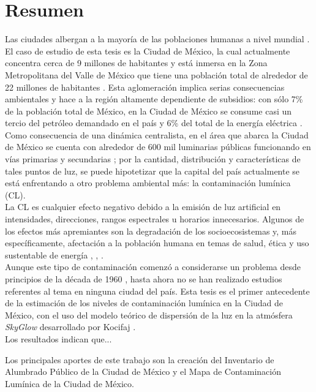 \chapter{Resumen}

Las ciudades albergan a la mayoría de las poblaciones humanas a nivel mundial \citep{Zari2018}. El caso de estudio de esta tesis es la Ciudad de México, la cual actualmente concentra cerca de 9 millones de habitantes \citep{INEGI2015} y está inmersa en la Zona Metropolitana del Valle de México que tiene una población total de alrededor de 22 millones de habitantes \citep{OCDE2015}. Esta aglomeración implica serias consecuencias ambientales y hace a la región altamente dependiente de subsidios: con sólo 7\% de la población total de México, en la Ciudad de México se consume casi un tercio del petróleo demandado en el país y 6\% del total de la energía eléctrica \citep{SENER2013}.\\

Como consecuencia de una dinámica centralista, en el área que abarca la Ciudad de México se cuenta con alrededor de 600 mil luminarias públicas funcionando en vías primarias y secundarias \citep{INFO2019}; por la cantidad, distribución y características de tales puntos de luz, se puede hipotetizar que la capital del país actualmente se está enfrentando a otro problema ambiental más: la contaminación lumínica (CL).\\

La CL es cualquier efecto negativo debido a la emisión de luz artificial en intensidades, direcciones, rangos espectrales u horarios innecesarios. Algunos de los efectos más apremiantes son la degradación de los socioecosistemas y, más específicamente, afectación a la población humana en temas de salud, ética y uso sustentable de energía \citep{AtlasREPSA}, \citep{LibroCL}, \citep{Stone2017}.\\

Aunque este tipo de contaminación comenzó a considerarse un problema desde principios de la década de 1960 \citep{LibroCL}, hasta ahora no se han realizado estudios referentes al tema en ninguna ciudad del país. Esta tesis es el primer antecedente de la estimación de los niveles de contaminación lumínica en la Ciudad de México, con el uso del modelo teórico de dispersión de la luz en la atmósfera \textit{SkyGlow} desarrollado por Kocifaj \citep{Kocifaj2007}.\\


Los resultados indican que...

Los principales aportes de este trabajo son la creación del Inventario de Alumbrado Público de la Ciudad de México y el Mapa de Contaminación Lumínica de la Ciudad de México.
